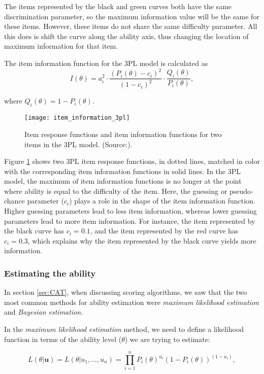 The items represented by the black and green curves both have the same discrimination parameter, so the maximum information value will be the same for these items. However, these items do not share the same difficulty parameter. All this does is shift the curve along the ability axis, thus changing the location of maximum information for that item.\newline

The item information function for the 3PL model is calculated as
$$I(\theta) = a_i^2 \cdot \dfrac{(P_i(\theta)-c_i)^2}{(1-c_i)^2} \cdot \dfrac{Q_i(\theta)}{P_i(\theta)},$$

where $Q_i(\theta) = 1-P_i(\theta)$.

\begin{figure}[H]
\centering
\texttt{[image: item\_information\_3pl]}
\caption{Item response functions and item information
functions for two items in the 3PL model. (Source:\cite{Visual-IRT}).}
\label{fig:item_information_3pl}
\end{figure}

Figure \ref{fig:item_information_3pl} shows two 3PL item response functions, in dotted lines, matched in color with the corresponding item information functions in solid lines. In the 3PL model, the maximum of item information functions is no longer at the point where ability is equal to the difficulty of the item. Here, the guessing or pseudo-chance parameter ($c_i$) plays a role in the shape of the item information function. Higher guessing parameters lead to less item information, whereas lower guessing parameters lead to more item information. For instance, the item represented by the black curve has $c_i=0.1$, and the item represented by the red curve has $c_i=0.3$, which explains why the item represented by the black curve yields more information.

\subsubsection{Estimating the ability}
In section \ref{sec:CAT}, when discussing scoring algorithms, we saw that the two most common methods for ability estimation were \textit{maximum likelihood estimation} and \textit{Bayesian estimation}.\newline

In the \textit{maximum likelihood estimation} method, we need to define a likelihood function in terms of the ability level ($\theta$) we are trying to estimate:

\begin{equation*}
L(\theta | \textbf{u}) = L(\theta | u_1, ..., u_n) = \prod_{i=1}^n P_i(\theta)^{u_i}(1 - P_i(\theta))^{(1 - u_i)} ,
\end{equation*}

